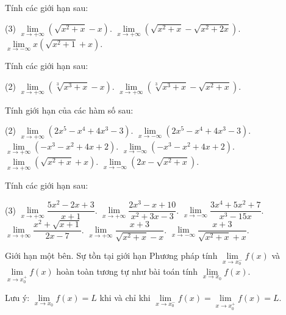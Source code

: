 \begin{vd}
	Tính các giới hạn sau:
	\begin{tasks}(3)
		\task $\lim\limits_{x\to +\infty}\left(\sqrt{x^2+x}-x \right) $. 	
		\task $\lim\limits_{x\to +\infty}\left(\sqrt{x^2+x}- \sqrt{x^2+2x}\right) $. 
		\task $\lim\limits_{x\to -\infty}x\left(\sqrt{x^2+1}+x\right)$.
	\end{tasks}
\end{vd}

\begin{vd}
	Tính các giới hạn sau:
	\begin{tasks}(2)
		\task $\lim\limits_{x\to +\infty}\left(\sqrt[3]{x^3+x}-x \right) $. 	
		\task $\lim\limits_{x\to +\infty}\left(\sqrt[3]{x^3+x}- \sqrt{x^2+x}\right) $. 		
	\end{tasks}
\end{vd}

 \begin{vd}
	Tính giới hạn của các hàm số sau:
	\begin{tasks}(2)
		\task $\lim\limits_{x\to +\infty}\left(2x^5-x^4+4x^3-3\right)$.
		\task $\lim\limits_{x\to -\infty}\left(2x^5-x^4+4x^3-3\right)$.
		\task $\lim\limits_{x\to +\infty}\left(-x^3-x^2+4x+2\right)$.
		\task $\lim\limits_{x\to -\infty}\left(-x^3-x^2+4x+2\right)$.
		\task $\lim\limits_{x\to +\infty}\left(\sqrt{x^2+x}+x \right) $. 	
		\task $\lim\limits_{x\to -\infty}\left(2x-\sqrt{x^2+x}\right) $. 	
	\end{tasks}
\end{vd}

 \begin{vd}
 	Tính các giới hạn sau:
 	\begin{tasks}(3)
 		\task $\lim\limits_{x\to +\infty}\dfrac{5x^2-2x+3}{x+1}$. 	
 		\task $\lim\limits_{x\to +\infty}\dfrac{2x^3-x+10}{x^2+3x-3}$. 	
 		\task $\lim\limits_{x\to -\infty}\dfrac{3x^{4}+5x^{2}+7}{x^{3}-15x}$.
 		\task $\lim\limits_{x\to +\infty}\dfrac{x^2+\sqrt{x+1}}{2x-7}$. 	
 		\task  $\lim\limits_{x\to +\infty}\dfrac{x+3}{\sqrt{x^2+x}-x}$. 	
 		\task  $\lim\limits_{x\to -\infty}\dfrac{x+3}{\sqrt{x^2+x}+x}$. 	 
 	\end{tasks}
 \end{vd}
 
\begin{dang}{Giới hạn một bên. Sự tồn tại giới hạn}
	Phương pháp tính $\lim\limits_{x\to x_0^-}f(x)$ và $\lim\limits_{x\to x_0^+}f(x)$ hoàn toàn tương tự như bài toán tính $\lim\limits_{x\to x_0} f(x)$.
	\begin{note}
		Lưu ý: $\lim\limits_{x\to x_0} f(x)=L$ khi và chỉ khi $\lim\limits_{x\to x_0^-}f(x)=\lim\limits_{x\to x_0^+}f(x)=L$.
	\end{note}
\end{dang}

